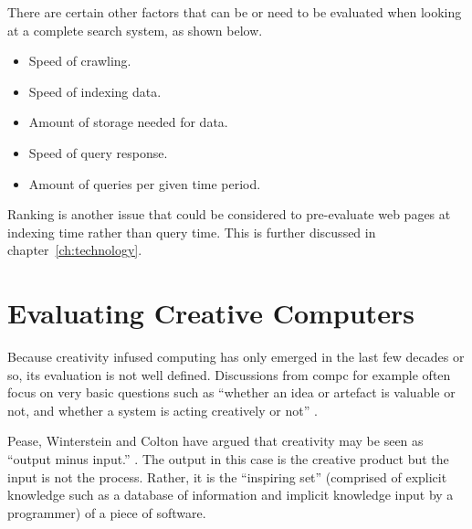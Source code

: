 There are certain other factors that can be or need to be evaluated when looking at a complete search system, as shown below.

\begin{itemize}
  \item Speed of crawling.
  \item Speed of indexing data.
  \item Amount of storage needed for data.
  \item Speed of query response.
  \item Amount of queries per given time period.
\end{itemize}

Ranking is another issue that could be considered to pre-evaluate web pages at indexing time rather than query time. This is further discussed in chapter~\ref{ch:technology}.






\section{Evaluating Creative Computers}
\label{s:creattributes}



Because creativity infused computing has only emerged in the last few decades or so, its evaluation is not well defined. Discussions from \gls{compc} for example often focus on very basic questions such as ``whether an idea or artefact is valuable or not, and whether a system is acting creatively or not'' \autocite{Pease2011}.

Pease, Winterstein and Colton have argued that creativity may be seen as ``output minus input.'' \autocite[p.2]{Pease2001}. The output in this case is the creative product but the input is not the process. Rather, it is the ``inspiring set'' (comprised of explicit knowledge such as a database of information and implicit knowledge input by a programmer) of a piece of software.

